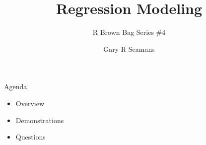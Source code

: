 \documentclass[11pt]{beamer}
\begin{document}
	\author{Gary R Seamans}
	\title{Regression Modeling}
	\subtitle{R Brown Bag Series \#4}
	\begin{frame}[plain]
		\maketitle
    \end{frame}

\begin{frame}{
	\begin{minipage}[t]{0.55\textwidth}
		Agenda
	\end{minipage}
	\hfill
	\begin{minipage}[t]{0.35\textwidth}
		\flushright
	\end{minipage}
}{}
\begin{center}
	\begin{itemize}
		\item Overview
		\item Demonstrations
		\item Questions
	\end{itemize}
\end{center}
\end{frame}
\end{document}
